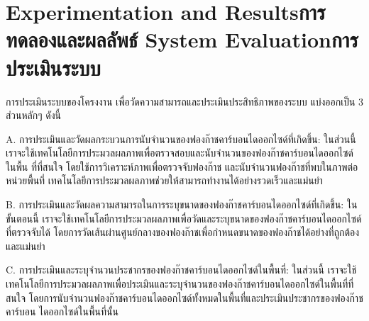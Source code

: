 \chapter{\ifproject%
\ifenglish Experimentation and Results\else การทดลองและผลลัพธ์\fi
\else%
\ifenglish System Evaluation\else การประเมินระบบ\fi
\fi}

การประเมินระบบของโครงงาน เพื่อวัดความสามารถและประเมินประสิทธิภาพของระบบ แบ่งออกเป็น 3 ส่วนหลักๆ ดังนี้

A. การประเมินและวัดผลกระบวนการนับจำนวนของฟองก๊าชคาร์บอนไดออกไซด์ที่เกิดขึ้น: ในส่วนนี้ เราจะใช้เทคโนโลยีการประมวลผลภาพเพื่อตรวจสอบและนับจำนวนของฟองก๊าชคาร์บอนไดออกไซด์ในพื้น ที่ที่สนใจ โดยใช้การวิเคราะห์ภาพเพื่อตรวจจับฟองก๊าช และนับจำนวนฟองก๊าชที่พบในภาพต่อหน่วยพื้นที่ เทคโนโลยีการประมวลผลภาพช่วยให้สามารถทำงานได้อย่างรวดเร็วและแม่นยำ

B. การประเมินและวัดผลความสามารถในการระบุขนาดของฟองก๊าชคาร์บอนไดออกไซด์ที่เกิดขึ้น: \newline
ในขั้นตอนนี้ เราจะใช้เทคโนโลยีการประมวลผลภาพเพื่อวัดและระบุขนาดของฟองก๊าชคาร์บอนไดออกไซด์ที่ตรวจจับได้ โดยการวัดเส้นผ่านศูนย์กลางของฟองก๊าชเพื่อกำหนดขนาดของฟองก๊าชได้อย่างที่ถูกต้องและแม่นยำ




C. การประเมินและระบุจำนวนประชากรของฟองก๊าชคาร์บอนไดออกไซด์ในพื้นที่: ในส่วนนี้ เราจะใช้เทคโนโลยีการประมวลผลภาพเพื่อประเมินและระบุจำนวนของฟองก๊าชคาร์บอนไดออกไซด์ในพื้นที่ที่สนใจ \newline
โดยการนับจำนวนฟองก๊าชคาร์บอนไดออกไซด์ทั้งหมดในพื้นที่และประเมินประชากรของฟองก๊าชคาร์บอน \newline
ไดออกไซด์ในพื้นที่นั้น


